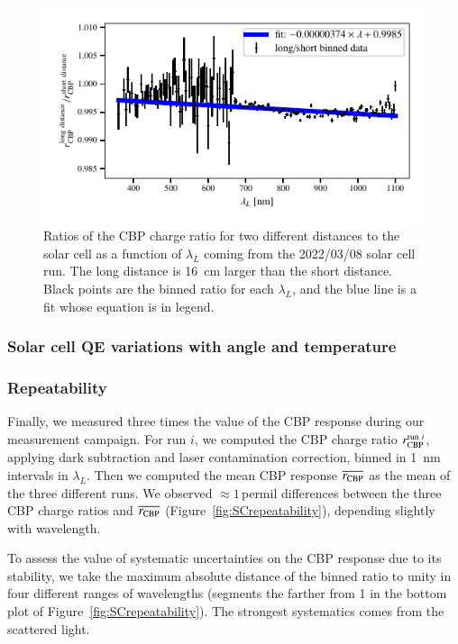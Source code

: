\begin{figure}[h]
    \centering
    \includegraphics[width=\columnwidth]{fig/sc_distance.pdf}
    \caption{Ratios of the CBP charge ratio for two different distances to the solar cell as a function of $\lambda_L$ coming from the 2022/03/08 solar cell run. The long distance is \SI{16}{\cm} larger than the short distance. Black points are the binned ratio for each $\lambda_L$, and the blue line is a fit whose equation is in legend.}
    \label{fig:sc_distance}
\end{figure}

\subsubsection{Solar cell QE variations with angle and temperature}



\subsubsection{Repeatability}

Finally, we measured three times the value of the CBP response during our measurement campaign. For run $i$, we computed the CBP charge ratio $r_{\rm CBP}^{\mathrm{run}\ i}$, applying dark subtraction and laser contamination correction, binned in \SI{1}{\nm} intervals in $\lambda_L$. Then we computed the mean CBP response $\overline{r_{\rm CBP}}$ as the mean of the three different runs. We observed $\approx 1$\,permil differences between the three CBP charge ratios and $\overline{r_{\rm CBP}}$ (Figure~\ref{fig:SCrepeatability}), depending slightly with wavelength.


To assess the value of systematic uncertainties on the CBP response due to its stability, we take the maximum absolute distance of the binned ratio to unity in four different ranges of wavelengths (segments the farther from 1 in the bottom plot of Figure~\ref{fig:SCrepeatability}). The strongest systematics comes from the scattered light.

